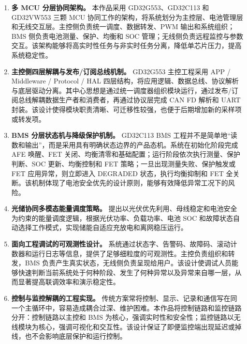 \begin{enumerate}[label=\arabic*、, leftmargin=*, itemsep=0.8ex, parsep=0pt, topsep=0.5ex]
  \item \textbf{多 MCU 分层协同架构。}  
  本作品采用 GD32G553、GD32C113 和 GD32VW553 三颗 MCU 协同工作的架构，将系统划分为主控层、电池管理层和无线交互层。主控侧负责统一调度、数据转发、PWM 输出和系统组织；BMS 侧负责电池测量、保护、均衡和 SOC 管理；无线侧负责远程监控与参数交互。该架构能够将高实时性任务与非实时任务分离，降低单芯片压力，提高系统稳定性。

  \item \textbf{主控侧四层解耦与发布/订阅总线机制。}  
  GD32G553 主控工程采用 APP / Middleware / Protocol / HAL 四层结构，将应用逻辑、数据总线、协议解析与底层驱动分离。其中心思想是通过统一调度器组织模块运行，通过发布/订阅总线解耦数据生产者和消费者，再通过协议层完成 CAN FD 解析和 UART 封装。该设计使得模块职责清晰、可迁移性较强，也便于后期增加新的采样项或转发项。

  \item \textbf{BMS 分层状态机与降级保护机制。}  
  GD32C113 BMS 工程并不是简单地“读数和输出”，而是采用具有明确状态边界的产品态机。系统在初始化阶段完成 AFE 唤醒、FET 关闭、均衡清零和基础配置；运行阶段依次执行测量、保护判断、SOC 更新、均衡控制和 FET 策略；一旦出现测量失败、保护触发或 FET 应用异常，则立即进入 DEGRADED 状态，执行均衡抑制和 FET 全关断。该机制体现了电池安全优先的设计原则，能够有效降低异常工况下的风险。

  \item \textbf{光储协同多模态能量调度策略。}  
  提出以光伏优先利用、母线稳定和电池安全为约束的能量调度逻辑，根据光伏功率、负载功率、电池 SOC 和故障状态自动选择工作模式，实现储能自适应充放电和离网稳压运行。

  \item \textbf{面向工程调试的可观测性设计。}  
  系统通过状态字、告警码、故障码、滚动计数器和运行日志等信息，提供了足够细粒度的可观测性。主控负责组织和转发，BMS 负责产生真实状态，无线侧负责呈现给用户。该设计使调试人员能够快速判断当前系统处于何种阶段、发生了何种异常以及异常来自哪一层，从而显著提高联调效率和演示稳定性。

  \item \textbf{控制与监控解耦的工程实现。}  
  传统方案常将控制、显示、记录和通信写在同一个主循环中，容易造成耦合过深、维护困难。本作品将控制链路和监控链路分开：控制链路以主控和 BMS 为核心，强调实时性和安全性；监控链路以无线模块为核心，强调可视化和交互性。该设计保证了即便监控端出现延迟或掉线，也不会影响底层保护和运行控制。
  

\end{enumerate}
